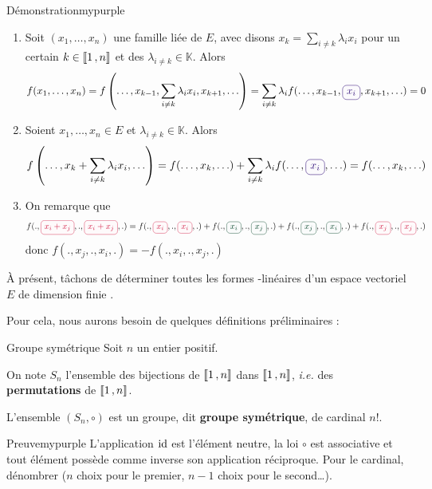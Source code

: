     \begin{demo}{Démonstration}{mypurple}
        \begin{enumerate}
            \item Soit $(x_1,\ldots,x_n)$ une famille liée de $E$, avec disons $x_k = \sum_{i \neq k} \lambda_i x_i$ pour un certain $k \in \left\llbracket 1 \, , n \right\rrbracket$ et des $\lambda_{i \neq k} \in \mathbb{K}$. Alors 
            \[ f(x_1,\ldots,x_n) = f\left(\ldots,x_{k-1}, \sum_{i \neq k} \lambda_i x_i, x_{k+1}, \ldots\right) = \sum_{i \neq k} \lambda_i f(\ldots,x_{k-1}, \lilbox{mypurple}{$x_i$}, x_{k+1}, \ldots) = 0 \]    
            \item Soient $x_1,\ldots,x_n \in E$ et $\lambda_{i \neq k} \in \mathbb{K}$. Alors
            \[ f\left(\ldots,x_k + \sum_{i\neq k} \lambda_i x_i, \ldots\right) = f(\ldots,x_k,\ldots) + \sum_{i \neq k} \lambda_i f(\ldots, \lilbox{mypurple}{$x_i$}, \ldots) = f(\ldots,x_k,\ldots) \]   
            \item On remarque que 
            \[ f(.,\lilbox{myred}{$x_i + x_j$},., \lilbox{myred}{$x_i + x_j$},.) = f(.,\lilbox{myred}{$x_i$},.,\lilbox{myred}{$x_i$},.) + f(.,\lilbox{mygreen}{$x_i$},.,\lilbox{mygreen}{$x_j$},.) + f(.,\lilbox{mygreen}{$x_j$},.,\lilbox{mygreen}{$x_i$},.) + f(.,\lilbox{myred}{$x_j$},.,\lilbox{myred}{$x_j$},.) \] 
            donc $f(.,x_j,.,x_i,.) = -f(.,x_i,.,x_j,.)$
        \end{enumerate}
    \end{demo}

    À présent, tâchons de déterminer toutes les formes -linéaires d’un espace vectoriel $E$ de dimension finie .

    Pour cela, nous aurons besoin de quelques définitions préliminaires :

    \begin{defitheo}{Groupe symétrique}{}
        Soit $n$ un entier positif.

        On note $S_n$ l’ensemble des bijections de $\left\llbracket 1 \, , n \right\rrbracket$ dans $\left\llbracket 1 \, , n \right\rrbracket$, \textit{i.e.} des \textbf{permutations} de $\left\llbracket 1 \, , n \right\rrbracket$.

        L’ensemble $(S_n, \circ)$ est un groupe, dit \textbf{groupe symétrique}, de cardinal $n!$.
    \end{defitheo}

    \begin{demo}{Preuve}{mypurple}
        L’application $\operatorname{id}$ est l’élément neutre, la loi $\circ$ est associative et tout élément possède comme inverse son application réciproque. Pour le cardinal, dénombrer ($n$ choix pour le premier, $n-1$ choix pour le second\ldots).
    \end{demo}

